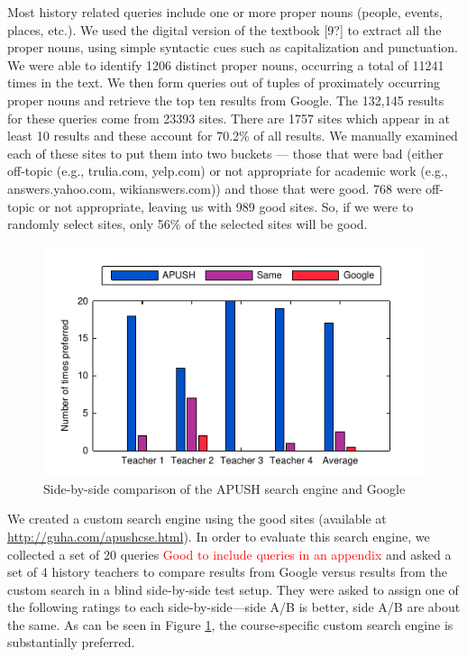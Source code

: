 \documentclass[pdfpagelabels=false,plainpages=true]{acm_proc_article-sp}
\begin{document}
Most history related queries include one or more proper nouns (people, events,
places, etc.). We used the digital version of the textbook [9?] to extract all
the proper nouns, using simple syntactic cues such as capitalization and
punctuation. We were able to identify 1206 distinct proper nouns, occurring a
total of 11241 times in the text. We then form queries out of tuples of
proximately occurring proper nouns and retrieve the top ten results from
Google. The 132,145 results for these queries come from 23393 sites. There are
1757 sites which appear in at least 10 results and these account for 70.2\% of
all results. We manually examined each of these sites to put them into two
buckets --- those that were bad (either off-topic (e.g., trulia.com, yelp.com)
or not appropriate for academic work (e.g., answers.yahoo.com, wikianswers.com))
and those that were good. 768 were off-topic or not appropriate, leaving us with
989 good sites. So, if we were to randomly select sites, only 56\% of the
selected sites will be good. 

\begin{figure}
\includegraphics{teacher_eval}
\caption{Side-by-side comparison of the APUSH search engine and Google}
\label{fig-eval}
\end{figure}

We created a custom search engine using the good sites (available at
\url{http://guha.com/apushcse.html}). In order to evaluate this search engine,
we collected a set of 20 queries \textcolor{red}{Good to include queries in an
  appendix} and asked a set of 4 history teachers to
compare results from Google versus results from the custom search in a blind
side-by-side test setup. They were asked to assign one of the following ratings
to each side-by-side---side A/B is better, side A/B are about the same. As can
be seen in Figure \ref{fig-eval}, the course-specific custom search engine is
substantially preferred.
\end{document}
